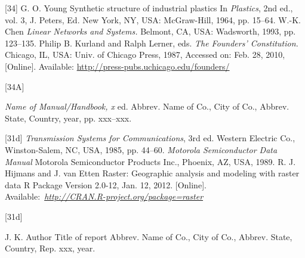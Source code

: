 \documentclass{IEEEtaes}
\begin{document}
\vspace*{-12pt}
\begin{thebibliography}{[34]}
\setcounter{enumiv}{6}
G. O. Young
\newblock Synthetic structure of industrial plastics
\newblock In \emph{Plastics}, 2nd ed., vol. 3, J. Peters, Ed. New York, NY, USA: McGraw-Hill, 1964, pp. 15--64.
W.-K. Chen
\newblock \emph{Linear Networks and Systems.} Belmont, CA, USA: Wadsworth, 1993, pp. 123--135.
Philip B. Kurland and Ralph Lerner, eds.
\newblock \emph{The Founders' Constitution.} Chicago, IL, USA: Univ. of Chicago Press, 1987, Accessed on: Feb. 28, 2010, {[}Online{]}. Available: \href{http://press-pubs.uchicago.edu/founders/}{\url{http://press-pubs.uchicago.edu/founders/}}
\end{thebibliography}

\vspace*{-12pt}
\begin{thebibliography}{[34A]}
\item[]  \emph{Name of Manual/Handbook, x} ed.
\newblock Abbrev. Name of Co., City of Co., Abbrev. State, Country, year, pp. xxx--xxx.
\end{thebibliography}

\vspace*{-12pt}
\begin{thebibliography}{[31d]}
\setcounter{enumiv}{9}
\emph{Transmission Systems for Communications}, 3rd ed.
\newblock Western Electric Co., Winston-Salem, NC, USA, 1985, pp. 44--60.
\emph{Motorola Semiconductor Data Manual}
\newblock Motorola Semiconductor Products Inc., Phoenix, AZ, USA, 1989.
R. J. Hijmans and J. van Etten
\newblock Raster: Geographic analysis and modeling with raster data
\newblock R Package Version 2.0-12, Jan. 12, 2012. {[}Online{]}. 
Available:~\emph{\href{http://CRAN.R-project.org/package=raster}{\url{http://CRAN.R-project.org/package=raster}}}
\end{thebibliography}

\vspace*{-12pt}

\begin{thebibliography}{[31d]}
\item[]  J. K. Author
\newblock Title of report
\newblock Abbrev. Name of Co., City of Co., Abbrev. State, Country, Rep. xxx, year.
\end{thebibliography}
\end{document}

